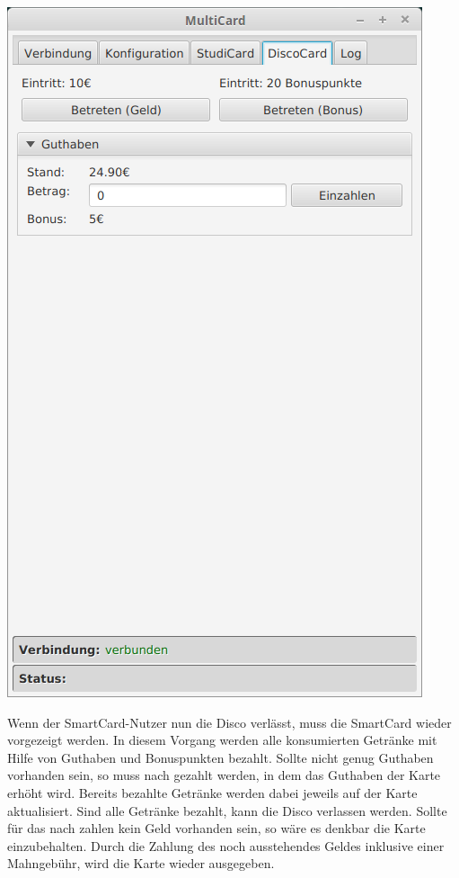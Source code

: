 \begin{center}
	\includegraphics[scale=0.4]{Images/DiscoCardTabEntry}
\end{center}


Wenn der SmartCard-Nutzer nun die Disco verlässt, muss die SmartCard wieder vorgezeigt werden.
In diesem Vorgang werden alle konsumierten Getränke mit Hilfe von Guthaben und Bonuspunkten bezahlt.
Sollte nicht genug Guthaben vorhanden sein, so muss nach gezahlt werden, in dem das Guthaben der Karte erhöht wird.
Bereits bezahlte Getränke werden dabei jeweils auf der Karte aktualisiert.
Sind alle Getränke bezahlt, kann die Disco verlassen werden.
Sollte für das nach zahlen kein Geld vorhanden sein, so wäre es denkbar die Karte einzubehalten.
Durch die Zahlung des noch ausstehendes Geldes inklusive einer Mahngebühr, wird die Karte wieder ausgegeben.

